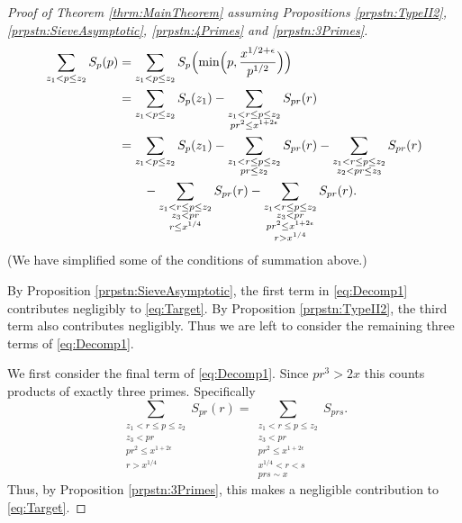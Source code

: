 \documentclass[10pt]{amsart}
\theoremstyle{plain}
\numberwithin{equation}{section}
\begin{document}
\begin{proof}[Proof of Theorem \ref{thrm:MainTheorem} assuming Propositions \ref{prpstn:TypeII2}, \ref{prpstn:SieveAsymptotic}, \ref{prpstn:4Primes} and \ref{prpstn:3Primes}]
\begin{align}
\sum_{z_1< p\le z_2}S_p(p)&=\sum_{z_1<p\le z_2}S_p\Bigl(\min\Bigl(p,\frac{x^{1/2+\epsilon}}{p^{1/2}}\Bigr)\Bigr)\nonumber\\
&=\sum_{z_1< p\le z_2}S_p(z_1)-\sum_{\substack{z_1< r\le p\le z_2\\ pr^2\le x^{1+2\epsilon}}}S_{p r}(r)\nonumber\\
&=\sum_{z_1< p\le z_2}S_p(z_1)-\sum_{\substack{z_1< r\le p\le z_2\\ p r\le z_2}}S_{p r}(r)-\sum_{\substack{z_1< r\le p\le z_2\\ z_2<p r\le z_3}}S_{p r}(r)\nonumber\\
&\qquad-\sum_{\substack{z_1< r\le p\le z_2\\ z_3<p r\\ r\le x^{1/4}}}S_{p r}(r)-\sum_{\substack{z_1< r\le p\le z_2\\ z_3<p r\\ p r^2\le x^{1+2\epsilon}\\ r>x^{1/4}}}S_{p r}(r).\label{eq:Decomp1}
\end{align}
(We have simplified some of the conditions of summation above.)

By Proposition \ref{prpstn:SieveAsymptotic}, the first term in \eqref{eq:Decomp1} contributes negligibly to \eqref{eq:Target}. By Proposition \ref{prpstn:TypeII2}, the third term also contributes negligibly. Thus we are left to consider the remaining three terms of \eqref{eq:Decomp1}. 

We first consider the final term of \eqref{eq:Decomp1}. Since $p r^3>2x$ this counts products of exactly three primes. Specifically
\[
\sum_{\substack{z_1< r\le p\le z_2\\ z_3<p r\\ p r^2\le x^{1+2\epsilon}\\ r>x^{1/4} }}S_{p r}(r)=\sum_{\substack{z_1< r\le p\le z_2\\ z_3<p r\\ p r^2\le x^{1+2\epsilon}\\ x^{1/4}< r< s\\ p r s\sim x}}S_{p r s}.
\]
Thus, by Proposition \ref{prpstn:3Primes}, this makes a negligible contribution to \eqref{eq:Target}.


\end{proof}
\end{document}
